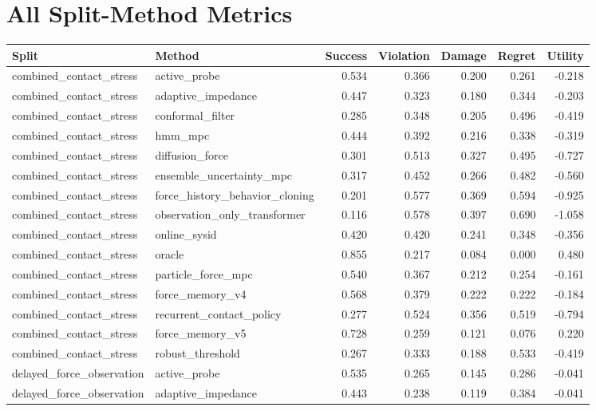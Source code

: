 \documentclass{article}
\begin{document}
\section{All Split-Method Metrics}
\begin{longtable}{llrrrrr}
\toprule
Split & Method & Success & Violation & Damage & Regret & Utility \\
\midrule
combined\_contact\_stress & active\_probe & 0.534 & 0.366 & 0.200 & 0.261 & -0.218 \\
combined\_contact\_stress & adaptive\_impedance & 0.447 & 0.323 & 0.180 & 0.344 & -0.203 \\
combined\_contact\_stress & conformal\_filter & 0.285 & 0.348 & 0.205 & 0.496 & -0.419 \\
combined\_contact\_stress & hmm\_mpc & 0.444 & 0.392 & 0.216 & 0.338 & -0.319 \\
combined\_contact\_stress & diffusion\_force & 0.301 & 0.513 & 0.327 & 0.495 & -0.727 \\
combined\_contact\_stress & ensemble\_uncertainty\_mpc & 0.317 & 0.452 & 0.266 & 0.482 & -0.560 \\
combined\_contact\_stress & force\_history\_behavior\_cloning & 0.201 & 0.577 & 0.369 & 0.594 & -0.925 \\
combined\_contact\_stress & observation\_only\_transformer & 0.116 & 0.578 & 0.397 & 0.690 & -1.058 \\
combined\_contact\_stress & online\_sysid & 0.420 & 0.420 & 0.241 & 0.348 & -0.356 \\
combined\_contact\_stress & oracle & 0.855 & 0.217 & 0.084 & 0.000 & 0.480 \\
combined\_contact\_stress & particle\_force\_mpc & 0.540 & 0.367 & 0.212 & 0.254 & -0.161 \\
combined\_contact\_stress & force\_memory\_v4 & 0.568 & 0.379 & 0.222 & 0.222 & -0.184 \\
combined\_contact\_stress & recurrent\_contact\_policy & 0.277 & 0.524 & 0.356 & 0.519 & -0.794 \\
combined\_contact\_stress & force\_memory\_v5 & 0.728 & 0.259 & 0.121 & 0.076 & 0.220 \\
combined\_contact\_stress & robust\_threshold & 0.267 & 0.333 & 0.188 & 0.533 & -0.419 \\
delayed\_force\_observation & active\_probe & 0.535 & 0.265 & 0.145 & 0.286 & -0.041 \\
delayed\_force\_observation & adaptive\_impedance & 0.443 & 0.238 & 0.119 & 0.384 & -0.041 \\

\end{longtable}
\end{document}

